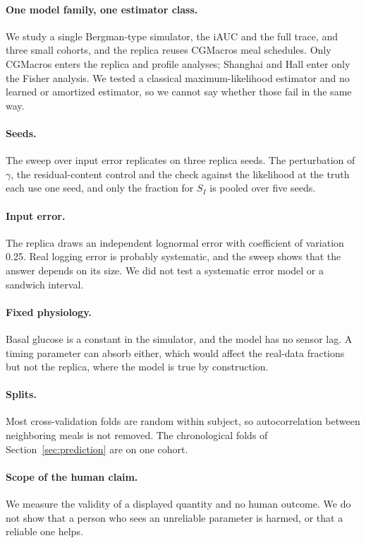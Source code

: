 \documentclass[letterpaper]{article} %
\begin{document}
\paragraph{One model family, one estimator class.} We study a single Bergman-type simulator, the iAUC and the full trace, and three small cohorts, and the replica reuses CGMacros meal schedules. Only CGMacros enters the replica and profile analyses; Shanghai and Hall enter only the Fisher analysis. We tested a classical maximum-likelihood estimator and no learned or amortized estimator, so we cannot say whether those fail in the same way.

\paragraph{Seeds.} The sweep over input error replicates on three replica seeds. The perturbation of $\gamma$, the residual-content control and the check against the likelihood at the truth each use one seed, and only the fraction for $S_I$ is pooled over five seeds.

\paragraph{Input error.} The replica draws an independent lognormal error with coefficient of variation 0.25. Real logging error is probably systematic, and the sweep shows that the answer depends on its size. We did not test a systematic error model or a sandwich interval.

\paragraph{Fixed physiology.} Basal glucose is a constant in the simulator, and the model has no sensor lag. A timing parameter can absorb either, which would affect the real-data fractions but not the replica, where the model is true by construction.

\paragraph{Splits.} Most cross-validation folds are random within subject, so autocorrelation between neighboring meals is not removed. The chronological folds of Section~\ref{sec:prediction} are on one cohort.

\paragraph{Scope of the human claim.} We measure the validity of a displayed quantity and no human outcome. We do not show that a person who sees an unreliable parameter is harmed, or that a reliable one helps.
\end{document}
